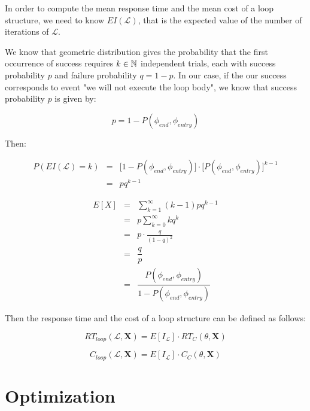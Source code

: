 In order to compute the mean response time and the mean cost of a loop structure, we need to know $EI(\mathcal{L})$, that is the expected value of the number of iterations of $\mathcal{L}$.

We know that geometric distribution gives the probability that the first occurrence of success requires $k \in \mathbb{N}$ independent trials, each with success probability $p$ and failure probability $q = 1 - p$. In our case, if the our success corresponds to event "we will not execute the loop body", we know that success probability $p$ is given by:

\begin{equation}
	p = 1 - P(\phi_{end}, \phi_{entry})
\end{equation}

Then:

\begin{eqnarray}
	P(EI(\mathcal{L}) = k) & = & \Big[  1 - P(\phi_{end}, \phi_{entry}) \Big] \cdot \bigg[  P(\phi_{end}, \phi_{entry}) \bigg] ^{k-1} \\
	& = & pq^{k-1}
\end{eqnarray}

\begin{eqnarray}
	E[X] & = & \sum_{k = 1}^\infty (k-1) pq^{k-1} \nonumber \\
	& = & p \sum_{k = 0}^\infty kq^{k} \nonumber \\
	& = & p \cdot \frac{q}{(1-q)^2} \nonumber \\
	& = & \dfrac{q}{p} \nonumber \\
	& = & \dfrac{P(\phi_{end}, \phi_{entry})}{1 - P(\phi_{end}, \phi_{entry})} 
\end{eqnarray}

Then the response time and the cost of a loop structure can be defined as follows:

\begin{equation}
	RT_{loop}(\mathcal{L}, \textbf{X}) = E[I_{\mathcal{L}}] \cdot RT_C(\theta, \textbf{X})
\end{equation}

\begin{equation}
	C_{loop}(\mathcal{L}, \textbf{X}) = E[I_{\mathcal{L}}] \cdot C_C(\theta, \textbf{X})
\end{equation}


\section{Optimization}


